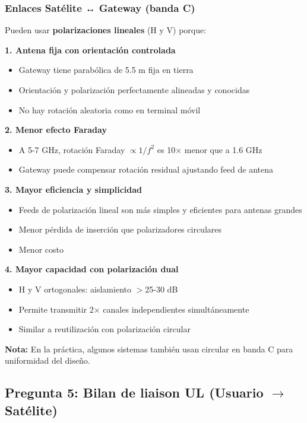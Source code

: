 \documentclass[a4paper,11pt]{article}
\begin{document}
\subsubsection*{Enlaces Satélite ↔ Gateway (banda C)}

Pueden usar \textbf{polarizaciones lineales} (H y V) porque:

\textbf{1. Antena fija con orientación controlada}
\begin{itemize}
    \item Gateway tiene parabólica de 5.5 m fija en tierra
    \item Orientación y polarización perfectamente alineadas y conocidas
    \item No hay rotación aleatoria como en terminal móvil
\end{itemize}

\textbf{2. Menor efecto Faraday}
\begin{itemize}
    \item A 5-7 GHz, rotación Faraday $\propto 1/f^2$ es 10× menor que a 1.6 GHz
    \item Gateway puede compensar rotación residual ajustando feed de antena
\end{itemize}

\textbf{3. Mayor eficiencia y simplicidad}
\begin{itemize}
    \item Feeds de polarización lineal son más simples y eficientes para antenas grandes
    \item Menor pérdida de inserción que polarizadores circulares
    \item Menor costo
\end{itemize}

\textbf{4. Mayor capacidad con polarización dual}
\begin{itemize}
    \item H y V ortogonales: aislamiento $>$25-30 dB
    \item Permite transmitir 2× canales independientes simultáneamente
    \item Similar a reutilización con polarización circular
\end{itemize}

\textbf{Nota:} En la práctica, algunos sistemas también usan circular en banda C para uniformidad del diseño.

\subsection*{Pregunta 5: Bilan de liaison UL (Usuario $\rightarrow$ Satélite)}
\end{document}

